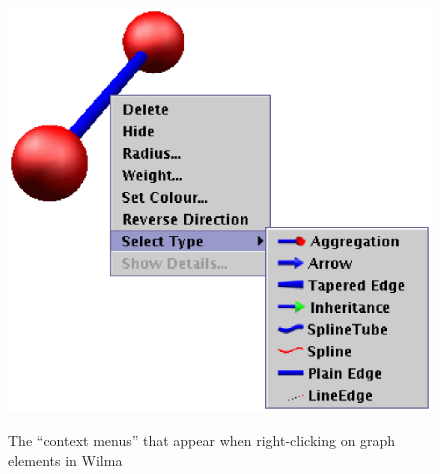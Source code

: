 \documentclass[runningheads]{cl2emult}
\begin{document}
\begin{figure}
{{    \includegraphics{figures/edgemenu.eps}}}
  \caption{The ``context menus'' that appear when right-clicking on graph
  elements in Wilma}
\end{figure}
\end{document}
